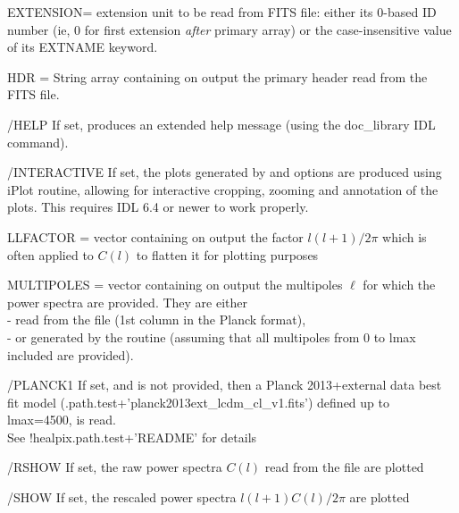 \begin{keywords}
  \begin{kwlist}{} %
       \item[EXTENSION=]%
	extension unit to be read from FITS file: 
 either its 0-based ID number (ie, 0 for first extension {\em after} primary array) 
 or the case-insensitive value of its EXTNAME keyword.
    \item[HDR =] %
	String array containing on output the primary header
      read from the FITS file. 
    \item[/HELP] %
	If set, produces an extended help message (using the doc\_library
    IDL command). 
    \item[/INTERACTIVE] %
	If set, the plots generated by  and  options are produced using iPlot routine, allowing 
           for interactive cropping, zooming and annotation of the plots. This
           requires IDL 6.4 or newer to work properly.
    \item[LLFACTOR =] %
	vector containing on output the factor $l(l+1)/2\pi$ which is often
          applied to $C(l)$ to flatten it for plotting purposes
    \item[MULTIPOLES =] %
	vector containing on output the multipoles
    $\ell$ for which the power spectra are provided. They are either\\
           - read from the file (1st column in the Planck format),\\
          - or generated by the routine (assuming that all
               multipoles from 0 to lmax included are provided).
%
    \item[/PLANCK1] %
           If set, and  
           is not provided, then a Planck 2013+external data best fit
          model
(.path.test+\-'planck2013ext\_lcdm\_cl\_v1.fits') 
          defined up to lmax=4500, is read.\\
          See !healpix.path.test+'README' for details
%
    \item[/RSHOW] %
	If set, the raw power spectra $C(l)$ read from the file are plotted
    \item[/SHOW] %
	If set, the rescaled power spectra $l(l+1)C(l)/2\pi$ are plotted

\end{kwlist}
\end{keywords}
